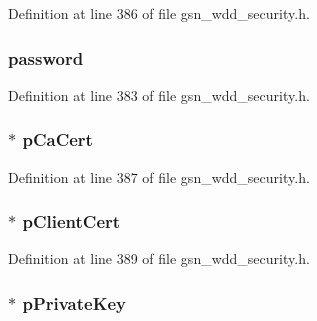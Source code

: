 Definition at line 386 of file gsn\_\-wdd\_\-security.h.

\hypertarget{a00287_a20cc3a5a97bc72ad6de7248fd09c5039}{
\subsubsection[{password}]{ {\bf password}}}
\label{a00287_a20cc3a5a97bc72ad6de7248fd09c5039}


Definition at line 383 of file gsn\_\-wdd\_\-security.h.

\hypertarget{a00287_aff3b0f6452ae07dafee494da7db35edd}{
\subsubsection[{pCaCert}]{$\ast$ {\bf pCaCert}}}
\label{a00287_aff3b0f6452ae07dafee494da7db35edd}


Definition at line 387 of file gsn\_\-wdd\_\-security.h.

\hypertarget{a00287_a5415c8104a892ba1beba657f6fc5005f}{
\subsubsection[{pClientCert}]{$\ast$ {\bf pClientCert}}}
\label{a00287_a5415c8104a892ba1beba657f6fc5005f}


Definition at line 389 of file gsn\_\-wdd\_\-security.h.

\hypertarget{a00287_a767185f45115923ca73705657883a7b8}{
\subsubsection[{pPrivateKey}]{$\ast$ {\bf pPrivateKey}}}
\label{a00287_a767185f45115923ca73705657883a7b8}


